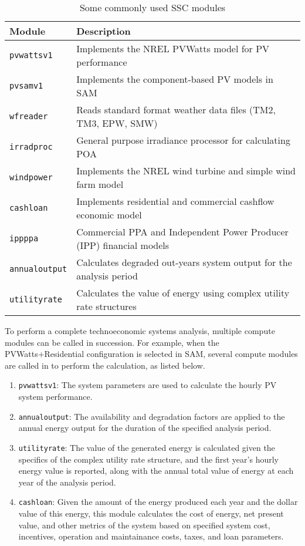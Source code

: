\documentclass{article}
\begin{document}
\begin{table}[ht]
\begin{center}
\begin{tabular}{ll}
Module & Description \\
\hline
\texttt{pvwattsv1} & Implements the NREL PVWatts model for PV performance\\
\texttt{pvsamv1} & Implements the component-based PV models in SAM\\
\texttt{wfreader} & Reads standard format weather data files (TM2, TM3, EPW, SMW)\\
\texttt{irradproc} & General purpose irradiance processor for calculating POA\\
\texttt{windpower} & Implements the NREL wind turbine and simple wind farm model\\
\texttt{cashloan} & Implements residential and commercial cashflow economic model\\
\texttt{ippppa} & Commercial PPA and Independent Power Producer (IPP) financial models\\
\texttt{annualoutput} & Calculates degraded out-years system output for the analysis period\\
\texttt{utilityrate} & Calculates the value of energy using complex utility rate structures\\
\end{tabular}
\caption{Some commonly used SSC modules}
\label{tab_sample_modules}
\end{center}
\end{table}

To perform a complete technoeconomic systems analysis, multiple compute modules can be called in succession.  For example, when the PVWatts+Residential configuration is selected in SAM, several compute modules are called in to perform the calculation, as listed below.

\begin{enumerate}
\item \texttt{pvwattsv1}: The system parameters are used to calculate the hourly PV system performance.
\item \texttt{annualoutput}: The availability and degradation factors are applied to the annual energy output for the duration of the specified analysis period.
\item \texttt{utilityrate}: The value of the generated energy is calculated given the specifics of the complex utility rate structure, and the first year's hourly energy value is reported, along with the annual total value of energy at each year of the analysis period.
\item \texttt{cashloan}: Given the amount of the energy produced each year and the dollar value of this energy, this module calculates the cost of energy, net present value, and other metrics of the system based on specified system cost, incentives, operation and maintainance costs, taxes, and loan parameters.
\end{enumerate}
\end{document}
